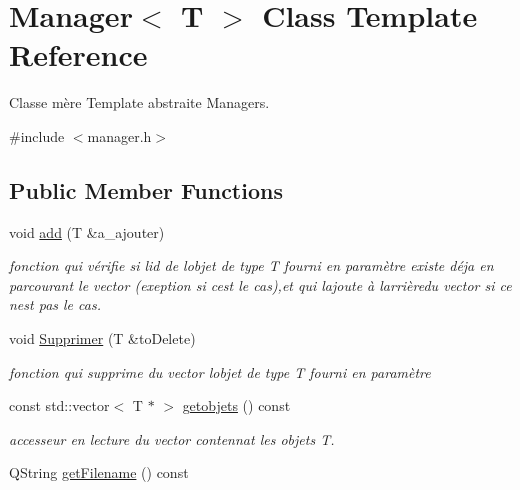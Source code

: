 \hypertarget{class_manager}{}\section{Manager$<$ T $>$ Class Template Reference}
\label{class_manager}


Classe mère Template abstraite Managers.  




{\ttfamily \#include $<$manager.\+h$>$}

\subsection*{Public Member Functions}
\begin{DoxyCompactItemize}
\item 
void \hyperlink{class_manager_a4eac07f3408be9a9c86273383e282b53}{add} (T \&a\+\_\+ajouter)
\begin{DoxyCompactList}\small\item\em fonction qui vérifie si l\textquotesingle{}id de l\textquotesingle{}objet de type T fourni en paramètre existe déja en parcourant le vector (exeption si c\textquotesingle{}est le cas),et qui l\textquotesingle{}ajoute à l\textquotesingle{}arrièredu vector si ce n\textquotesingle{}est pas le cas. \end{DoxyCompactList}\item 
void \hyperlink{class_manager_a5ad1071a0ca361daea98576c433774c8}{Supprimer} (T \&to\+Delete)
\begin{DoxyCompactList}\small\item\em fonction qui supprime du vector l\textquotesingle{}objet de type T fourni en paramètre \end{DoxyCompactList}\item 
\mbox{\label{class_manager_a53786650c42236c2c346cda79cb3cee3}} 
const std\+::vector$<$ T $\ast$ $>$ \hyperlink{class_manager_a53786650c42236c2c346cda79cb3cee3}{getobjets} () const
\begin{DoxyCompactList}\small\item\em accesseur en lecture du vector contennat les objets T. \end{DoxyCompactList}\item 
\mbox{\label{class_manager_a5f6a3a94521559731ef49005d7669464}} 
Q\+String \hyperlink{class_manager_a5f6a3a94521559731ef49005d7669464}{get\+Filename} () const

\end{DoxyCompactItemize}
